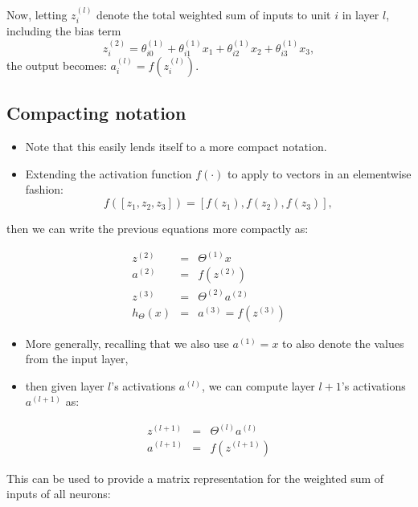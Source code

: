 \documentclass[
  letterpaper,
  DIV=11,
  numbers=noendperiod,
  oneside]{scrartcl}
\begin{document}
Now, letting \(z_i^{(l)}\) denote the total weighted sum of inputs to
unit \(i\) in layer \(l\), including the bias term \[
z_i^{(2)}=\theta_{i0}^{(1)}+\theta_{i1}^{(1)}x_1+\theta_{i2}^{(1)}x_2+\theta_{i3}^{(1)}x_3,
\] the output becomes: \(a_i^{(l)}=f(z_i^{(l)})\).

\hypertarget{compacting-notation}{%
\subsection{Compacting notation}\label{compacting-notation}}

\begin{itemize}
\item
  Note that this easily lends itself to a more compact notation.
\item
  Extending the activation function \(f(\cdot)\) to apply to vectors in
  an elementwise fashion: \[
  f([z_1,z_2,z_3]) = [f(z_1), f(z_2),f(z_3)],
  \]
\end{itemize}

then we can write the previous equations more compactly as:

\begin{eqnarray}
z^{(2)}&=&\Theta^{(1)}x\nonumber\\
a^{(2)}&=&f(z^{(2)})\nonumber\\
z^{(3)}&=&\Theta^{(2)}a^{(2)}\nonumber\\
h_{\Theta}(x)&=&a^{(3)}=f(z^{(3)})\nonumber
\end{eqnarray}

\begin{itemize}
\item
  More generally, recalling that we also use \(a^{(1)}=x\) to also
  denote the values from the input layer,
\item
  then given layer \(l\)'s activations \(a^{(l)}\), we can compute layer
  \(l+1\)'s activations \(a^{(l+1)}\) as:
\end{itemize}

\begin{eqnarray}
z^{(l+1)}&=&\Theta^{(l)}a^{(l)}\\
a^{(l+1)}&=&f(z^{(l+1)})
\end{eqnarray}

This can be used to provide a matrix representation for the weighted sum
of inputs of all neurons:
\end{document}
